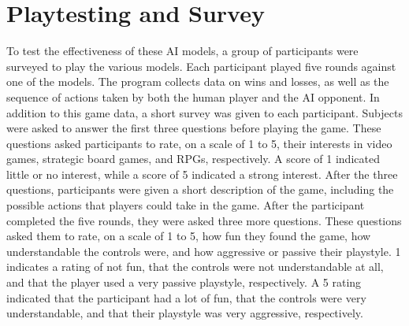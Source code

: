 \section{Playtesting and Survey}
To test the effectiveness of these AI models, a group of participants were surveyed to play the various models. Each participant played five rounds against one of the models. The program collects data on wins and losses, as well as the sequence of actions taken by both the human player and the AI opponent. In addition to this game data, a short survey was given to each participant. Subjects were asked to answer the first three questions before playing the game. These questions asked participants to rate, on a scale of 1 to 5, their interests in video games, strategic board games, and RPGs, respectively. A score of 1 indicated little or no interest, while a score of 5 indicated a strong interest. After the three questions, participants were given a short description of the game, including the possible actions that players could take in the game. After the participant completed the five rounds, they were asked three more questions. These questions asked them to rate, on a scale of 1 to 5, how fun they found the game, how understandable the controls were, and how aggressive or passive their playstyle. 1 indicates a rating of not fun, that the controls were not understandable at all, and that the player used a very passive playstyle, respectively. A 5 rating indicated that the participant had a lot of fun, that the controls were very understandable, and that their playstyle was very aggressive, respectively.\\

